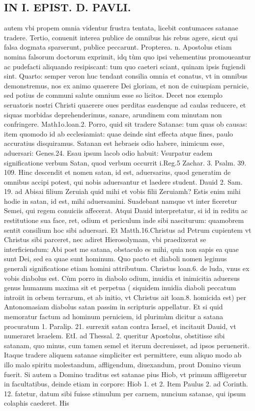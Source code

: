 \documentclass{article}
\begin{document}
\begin{pages}
\section*{IN I. EPIST. D. PAVLI. }
\marginpar{[ p.62 ]}\pstart autem vbi propem omnia videntur frustra tentata, licebit contumaces satanae tradere. Tertio, conuenit interea publice de omnibus his rebus agere, sicut qui falsa dogmata sparserunt, publice peccarunt. Propterea. n. Apostolus etiam nomina falsorum doctorum exprimit, idq tùm quo ipsi vehementius promoueantur ac pudefacti aliquando resipiscant: tum quo caeteri sciant, quinam ipsis fugiendi sint. Quarto: semper veron huc tendant consilia omnia et conatus, vt in omnibus demonstremus, nos ex animo quaerere Dei gloriam, et non de cuiuspiam pernicie, sed potius de communi salute omnium esse so licitos. Decet nos exemplo seruatoris nostri Christi quaerere oues perditas easdenque ad caulas reducere, et siquas morbidas deprehenderimus, sanare, arundinem com minutam non confringere. Math1o.loan.2.  \pend\pstart Porro, quid sit tradere Satanae: tum quas ob causas: item quomodo id ab ecclesiamiat: quae deinde sint effecta atque  fines, paulo accuratius disquiramus. Satanan est hebraeis odio habere, inimicum esse, aduersari: Genes.24. Esau ipsum lacob odio habuit: Vsurpatur eadem significatione verbum Satan, quod verbum occurrit i.Reg.5 Zachar. 3. Psalm. 39. 109. Hinc descendit et nomen satan, id est, aduersarius, quod generatim de omnibus accipi potest, qui nobis aduersantur et laedere student. Dauid 2. Sam. 19. ad Abisai filium Zeruiah quid mihi et vobis filii Zeruiamh? Estis enim mihi hodie in satan, id est, mihi aduersamini. Suadebant namque  vt inter ficeretur Semei, qui regem conuiciis affecerat. Atqui Dauid interpretatur, si id in reditu ac restitutione sua face, ret, odium et periculum inde sibi nasciturum: quamobrem sentit consilium hoc sibi aduersari. Et Matth.16.Christus ad Petrum cupientem vt Christus sibi parceret, nec adiret Hierosolymam, vbi praedixerat se interficiendum: Abi post me satana, obstaculo es mihi, quia non sapis ea quae sunt Dei, sed ea quae sunt hominum. Quo pacto et diaboli nomen legimus generali significatione etiam homini attributum. Christus loan.6. de luda, vnus ex vobis diabolus est. Cùm porro in diabolo odium, inuidia et inimicitia aduersus genus humanum maxima sit et perpetua ( siquidem inuidia diaboli peccatum introiit in orbem terrarum, et ab initio, vt Christus ait loan.8. homicida est) per Antonomasiam diabolus satan passim in scripturis appellatur. Et si quid memoratur factum ad hominum perniciem, id plurimùm dicitur a satana procuratum 1. Paralip. 21. surrexit satan contra Israel, et incitauit Dauid, vt numeraret lsraelem. EtI. ad Thessal. 2. queritur Apostolus, obstitisse sibi satanam, quo minus, cum tamen semel et iterum decreuisset, ad ipsos peruenerit. Itaque  tradere aliquem satanae simpliciter est permittere, eum aliquo modo ab illo malo spiritu molestandum, affligendum, diuexandum, prout Domino visum fuerit. Si autem a Domino traditus est satanae pius Hiob, vt primum affligeretur in facultatibus, deinde etiam in corpore: Hiob 1. et 2. Item Paulus 2. ad Corinth. 12. fatetur, datum sibi fuisse stimulum per carnem, nuncium satanae, qui ipsum colaphis caederet. His 
\end{pages}
\end{document}
